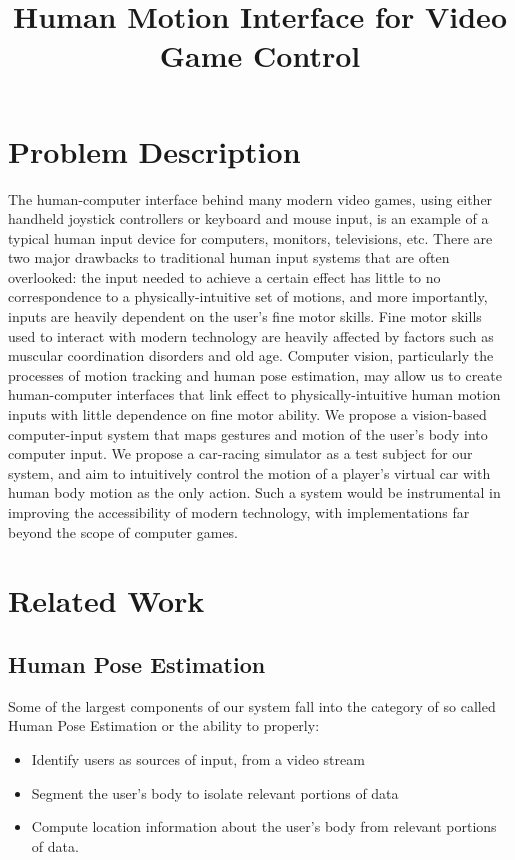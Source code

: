 \documentclass[10pt,twocolumn,letterpaper]{article}
\begin{document}
\title{Human Motion Interface for Video Game Control}
\maketitle

\section{Problem Description}
The human-computer interface behind many modern video games, using either handheld 
joystick controllers or keyboard and mouse input, is an example
of a typical human input device for computers, monitors, televisions, etc. There are two 
major drawbacks to traditional human input systems that are often overlooked: the input needed 
to achieve a certain effect has little to no correspondence to a physically-intuitive set 
of motions, and more importantly, inputs are heavily dependent on the user's fine motor skills. 
Fine motor skills used to interact with modern technology are heavily affected by factors such 
as muscular coordination disorders and old age. Computer vision, particularly the processes 
of motion tracking and human pose estimation, may allow us to create human-computer interfaces 
that link effect to physically-intuitive human motion inputs with little dependence on 
fine motor ability. We propose a vision-based computer-input system that maps gestures and 
motion of the user's body into computer input. We propose a car-racing simulator as a test 
subject for our system, and aim to intuitively control the motion of a player's virtual car 
with human body motion as the only action. Such a system would be instrumental in improving 
the accessibility of modern technology, with implementations far beyond the scope of computer 
games.

\section{Related Work}
\subsection{Human Pose Estimation}
Some of the largest components of our system fall into the category of so called Human 
Pose Estimation or the ability to properly:

\begin{itemize}
    \item Identify users as sources of input, from a video stream
    \item Segment the user's body to isolate relevant portions of data
    \item Compute location information about the user's body from relevant portions of data.
\end{itemize}
\end{document}

